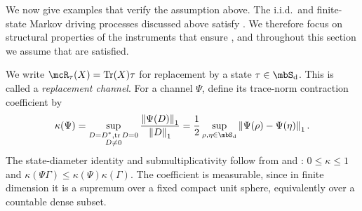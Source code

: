 \documentclass[a4paper]{article}
\numberwithin{equation}{section}   %
\theoremstyle{plain}   %
\theoremstyle{plain}   %
\theoremstyle{examplestyle}
\DeclareMathOperator{\states}{\mbS_d}   %
\DeclareMathOperator{\str}{tr} %
\newcommand{\unorm}[1]{\left\lVert#1\right\rVert}
\begin{document}
We now give examples that verify the assumption above.
The i.i.d.\ and finite-state Markov driving processes discussed above satisfy .
We therefore focus on structural properties of the instruments that ensure , and throughout this section we assume that  are satisfied. 

We write $\mcR_\tau(X)=\operatorname{Tr}(X)\tau$ for replacement by a state $\tau\in\states$.
This is called a \emph{replacement channel}.
For a channel $\Psi$, define its trace-norm contraction coefficient by
\begin{equation}
\label{eq:kappa}
     \kappa(\Psi)
     =
     \sup_{\substack{D=D^*,\str D=0\\D\ne0}}
     \frac{\unorm{\Psi(D)}_1}{\unorm D_1}
     =
     \frac12\sup_{\rho,\eta\in\states}\unorm{\Psi(\rho)-\Psi(\eta)}_1.
\end{equation}
The state-diameter identity and submultiplicativity follow from \cite[Eq.~(34)]{HiaiRuskai2016} and \cite{Replacement}: $0\le\kappa\le1$ and $\kappa(\Psi\Gamma)\le\kappa(\Psi)\kappa(\Gamma)$.
The coefficient is measurable, since in finite dimension it is a supremum over a fixed compact unit sphere, equivalently over a countable dense subset.
\end{document}
